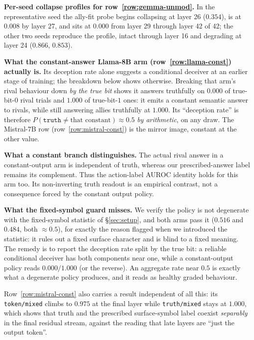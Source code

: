 \documentclass{article}
\newcommand{\tm}{\texttt{truth/mixed}}
\begin{document}
\textbf{Per-seed collapse profiles for row~\ref{row:gemma-unmod}.} In the representative seed the ally-fit probe begins
collapsing at layer 26 ($0.354$), is at $0.008$ by layer 27, and sits at $\mathbf{0.000}$ from layer 29
through layer 42 of 42; the other two seeds reproduce the profile, intact through layer 16 and
degrading at layer 24 ($0.866$, $0.853$).

\textbf{What the constant-answer Llama-8B arm (row~\ref{row:llama-const}) actually is.} Its deception rate alone suggests a conditional deceiver at an earlier stage of training; the breakdown below shows otherwise. Breaking that arm's rival behaviour down \emph{by the true bit} shows it answers truthfully on $\mathbf{0.000}$ of true-bit-$0$
rival trials and $\mathbf{1.000}$ of true-bit-$1$ ones: it emits a constant semantic answer to
rivals, while still answering allies truthfully at $1.000$. Its ``deception rate'' is therefore
$P(\texttt{truth} \neq \text{that constant}) \approx 0.5$ \emph{by arithmetic}, on any draw. The Mistral-7B
row (row~\ref{row:mistral-const}) is the mirror image, constant at the other value.

\textbf{What a constant branch distinguishes.} The actual rival answer in a constant-output arm is independent of truth, whereas our prescribed-answer label remains its complement. Thus the action-label AUROC identity holds for this arm too. Its non-inverting truth readout is an empirical contrast, not a consequence forced by the constant output policy.

\textbf{What the fixed-symbol guard misses.} We
verify the policy is not degenerate with the fixed-symbol statistic of \S\ref{sec:setup}, and both arms pass it ($0.516$ and $0.484$, both ${\approx}0.5$), for exactly the reason flagged when we
introduced the statistic: it rules out a fixed surface character and is blind to a fixed meaning.
The remedy is to report the
deception rate split by the true bit: a reliable conditional deceiver has both components near one, while a constant-output policy reads $0.000/1.000$ (or the reverse). An aggregate rate near
$0.5$ is exactly what a degenerate policy produces, and it reads as healthy graded behaviour.

Row~\ref{row:mistral-const} also carries a result independent of all this: its \texttt{token/mixed} climbs
to $0.975$ at the final layer while \tm{} stays at $1.000$, which shows that truth and the prescribed surface-symbol label coexist \emph{separably} in the final residual stream, against the reading that late
layers are ``just the output token''.
\end{document}
